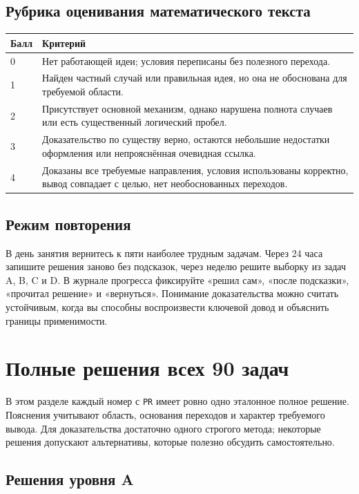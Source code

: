 \documentclass[11pt,a4paper,openany]{book}
\begin{document}
\section{Рубрика оценивания математического текста}
\begin{longtable}{p{}p{}}\toprule Балл & Критерий\\\midrule\endhead
0 & Нет работающей идеи; условия переписаны без полезного перехода.\\
1 & Найден частный случай или правильная идея, но она не обоснована для требуемой области.\\
2 & Присутствует основной механизм, однако нарушена полнота случаев или есть существенный логический пробел.\\
3 & Доказательство по существу верно, остаются небольшие недостатки оформления или непрояснённая очевидная ссылка.\\
4 & Доказаны все требуемые направления, условия использованы корректно, вывод совпадает с целью, нет необоснованных переходов.\\\bottomrule\end{longtable}
\section{Режим повторения}
В день занятия вернитесь к пяти наиболее трудным задачам. Через 24 часа запишите решения заново без подсказок, через неделю решите выборку из задач A, B, C и D. В журнале прогресса фиксируйте «решил сам», «после подсказки», «прочитал решение» и «вернуться». Понимание доказательства можно считать устойчивым, когда вы способны воспроизвести ключевой довод и объяснить границы применимости.

\chapter{Полные решения всех 90 задач}
\begin{keybox}
В этом разделе каждый номер с \texttt{PR} имеет ровно одно эталонное полное решение. Пояснения учитывают область, основания переходов и характер требуемого вывода. Для доказательства достаточно одного строгого метода; некоторые решения допускают альтернативы, которые полезно обсудить самостоятельно.
\end{keybox}

\section{Решения уровня A}
\end{document}
